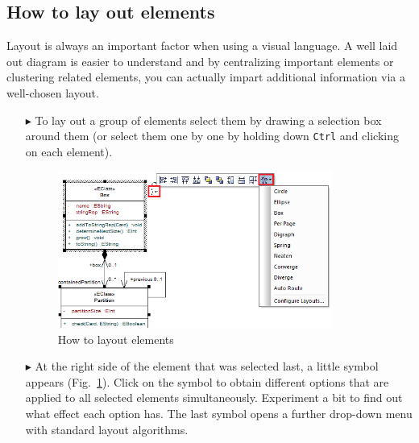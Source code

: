 \subsection{How to lay out elements}

Layout is always an important factor when using a visual language. A well laid out diagram is easier to understand and by centralizing important elements or
clustering related elements, you can actually impart additional information via a well-chosen layout.

\begin{enumerate}
\item[$\blacktriangleright$] To lay out a group of elements select them by drawing a selection box around them (or select them one by one by holding down
\texttt{Ctrl} and clicking on each element).

\begin{figure}[htbp]
\begin{center} 
  \includegraphics[width=0.85\textwidth]{layoutElements1}
  \caption{How to layout elements}  
  \label{fig_layout01}
\end{center}
\end{figure}
 
\item[$\blacktriangleright$] At the right side of the element that was selected last, a little symbol appears (Fig.~\ref{fig_layout01}). Click on the symbol to
obtain different options that are applied to all selected elements simultaneously. Experiment a bit to find out what effect each option has. The last symbol
opens a further drop-down menu with standard layout algorithms.


\end{enumerate}

